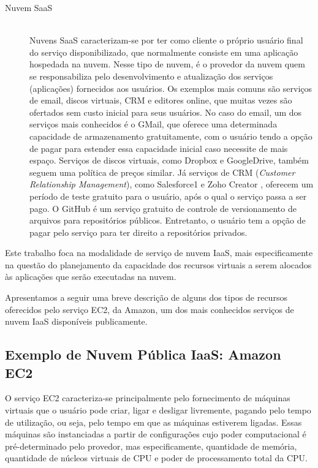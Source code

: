 \begin{description}
\item[Nuvem SaaS] \hfill \\ Nuvens SaaS caracterizam-se por ter como cliente o
próprio usuário final do serviço disponibilizado, que normalmente consiste em uma
aplicação hospedada na nuvem. Nesse tipo de nuvem, é o provedor da nuvem quem se
responsabiliza pelo desenvolvimento e atualização dos serviços (aplicações) 
fornecidos aos usuários. Os exemplos mais comuns são serviços de email, discos virtuais, 
CRM e editores online, que muitas vezes são ofertados sem custo inicial para seus 
usuários. No caso do email, um dos serviços mais conhecidos é o GMail, que oferece 
uma determinada capacidade de armazenamento gratuitamente, com o usuário tendo a 
opção de pagar para estender essa capacidade inicial caso necessite de mais espaço. 
Serviços de discos virtuais, como Dropbox e GoogleDrive, também seguem uma política 
de preços similar. Já serviços de CRM (\emph{Customer Relationship Management}), 
como Salesforce1 \cite{salesforce} e Zoho Creator \cite{zoho}, oferecem um período de teste gratuito 
para o usuário, após o qual o serviço passa a ser pago. O GitHub \cite{github} é um 
serviço gratuito de controle de versionamento de arquivos para repositórios 
públicos. Entretanto, o usuário tem a opção de pagar pelo serviço para ter direito 
a repositórios privados.



\end{description}

Este trabalho foca na modalidade de serviço de nuvem IaaS, mais especificamente na questão do planejamento da capacidade dos recursos virtuais a serem alocados às aplicações que serão executadas na nuvem.

Apresentamos a seguir uma breve descrição de alguns dos tipos de recursos oferecidos pelo serviço EC2,
da Amazon, um dos mais conhecidos serviços de nuvem IaaS disponíveis publicamente.

\subsection{Exemplo de Nuvem Pública IaaS: Amazon EC2}

O serviço EC2 caracteriza-se principalmente pelo fornecimento de máquinas virtuais
que o usuário pode criar, ligar e desligar livremente, pagando pelo tempo de
utilização, ou seja, pelo tempo em que as máquinas estiverem ligadas. Essas 
máquinas são instanciadas a partir de configurações cujo poder computacional é 
pré-determinado pelo provedor, mas especificamente, quantidade de memória, 
quantidade de núcleos virtuais de CPU e poder de processamento total da CPU.

